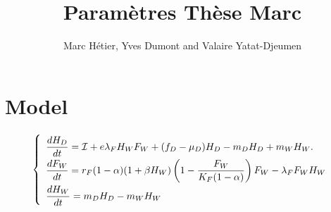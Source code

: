 \documentclass{article}
\title{Paramètres Thèse Marc}
\author{Marc Hétier, Yves Dumont  and Valaire Yatat-Djeumen}
\newcommand{\lfw}{\lambda_{F}}
\newcommand{\cI}{\mathcal{I}}
\begin{document}
\maketitle
\section{Model}

\begin{equation}
\def\arraystretch{2}
\left\{ 
\begin{array}{l}
\dfrac{dH_D}{dt}= \cI + e\lfw H_W F_W + (f_D - \mu_D) H_D - m_D H_D + m_W H_W. \\
\dfrac{dF_W}{dt} = r_F(1- \alpha) (1+ \beta H_W) \left(1 - \dfrac{F_W}{K_F(1-\alpha)} \right) F_W - \lfw F_W H_W \\
\dfrac{dH_W}{dt}= m_D H_D - m_W H_W 
\end{array} \right.
\label{equationsHDFWHW}
\end{equation}
\end{document}
